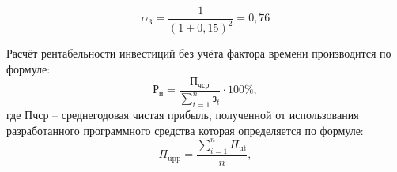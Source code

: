 \[
\alpha_3 = \frac{1}{(1+0{,}15)^2} = 0{,}76
\]

Расчёт рентабельности инвестиций без учёта фактора времени производится по формуле:
\begin{equation}
	\mathrm{Р_{и}} = \frac{\mathrm{П_{чср}}}{\sum_{t=1}^{n} \text{з}_t} \cdot 100\%,
\end{equation}
где Пчср – среднегодовая чистая прибыль, полученной от использования разработанного программного средства которая определяется по формуле:
\begin{equation}
	\Pi_{\mathrm{upp}} = \frac{\sum_{i=1}^{n} \Pi_{\mathrm{ut}}}{n},
\end{equation}
\newpage